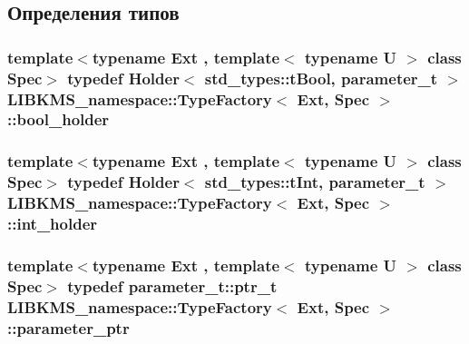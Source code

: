 \subsection{Определения типов}
\hypertarget{classLIBKMS__namespace_1_1TypeFactory_a5af2bfe6425fe90d4951268240dc1768}{
\subsubsection[{bool\-\_\-holder}]{\setlength{\rightskip}{0pt plus 5cm}template$<$typename Ext , template$<$ typename U $>$ class Spec$>$ typedef {\bf Holder}$<$ std\-\_\-types\-::t\-Bool, {\bf parameter\-\_\-t} $>$ {\bf L\-I\-B\-K\-M\-S\-\_\-namespace\-::\-Type\-Factory}$<$ Ext, Spec $>$\-::{\bf bool\-\_\-holder}}}\label{classLIBKMS__namespace_1_1TypeFactory_a5af2bfe6425fe90d4951268240dc1768}
\hypertarget{classLIBKMS__namespace_1_1TypeFactory_a118a2227ad78008ae8e7d16c9d7f854a}{
\subsubsection[{int\-\_\-holder}]{\setlength{\rightskip}{0pt plus 5cm}template$<$typename Ext , template$<$ typename U $>$ class Spec$>$ typedef {\bf Holder}$<$ std\-\_\-types\-::t\-Int, {\bf parameter\-\_\-t} $>$ {\bf L\-I\-B\-K\-M\-S\-\_\-namespace\-::\-Type\-Factory}$<$ Ext, Spec $>$\-::{\bf int\-\_\-holder}}}\label{classLIBKMS__namespace_1_1TypeFactory_a118a2227ad78008ae8e7d16c9d7f854a}
\hypertarget{classLIBKMS__namespace_1_1TypeFactory_a54c61c4d970a37a1059746070a1eea11}{
\subsubsection[{parameter\-\_\-ptr}]{\setlength{\rightskip}{0pt plus 5cm}template$<$typename Ext , template$<$ typename U $>$ class Spec$>$ typedef {\bf parameter\-\_\-t\-::ptr\-\_\-t} {\bf L\-I\-B\-K\-M\-S\-\_\-namespace\-::\-Type\-Factory}$<$ Ext, Spec $>$\-::{\bf parameter\-\_\-ptr}}}\label{classLIBKMS__namespace_1_1TypeFactory_a54c61c4d970a37a1059746070a1eea11}
